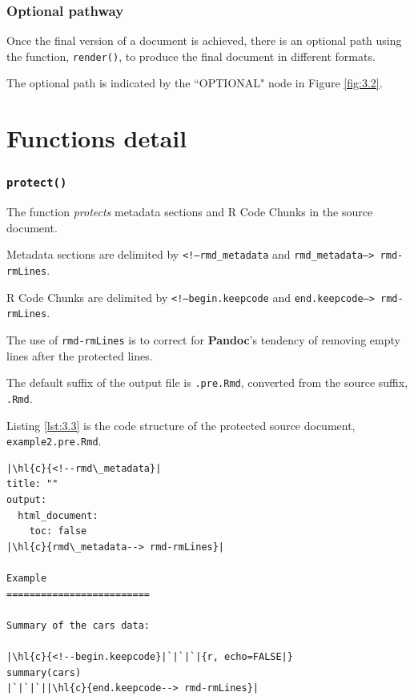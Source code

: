 \documentclass[a4paper, 12pt]{report}
\begin{document}
\subsubsection*{Optional pathway}
Once the final version of a document is achieved, there is an optional path using the function, \texttt{render()}, to produce the final document in different formats.

The optional path is indicated by the ``OPTIONAL" node in Figure \ref{fig:3.2}.



\newpage
\section{Functions detail}
\subsubsection*{\texttt{protect()}}
The function \emph{protects} metadata sections and R Code Chunks in the source document.

Metadata sections are delimited by \texttt{<!--rmd\_metadata} and \texttt{rmd\_metadata--> rmd-rmLines}.

R Code Chunks are delimited by \texttt{<!--begin.keepcode} and \texttt{end.keepcode--> rmd-rmLines}.

The use of \texttt{rmd-rmLines} is to correct for \textbf{Pandoc}'s tendency of removing empty lines after the protected lines.

The default suffix of the output file is \texttt{.pre.Rmd}, converted from the source suffix, \texttt{.Rmd}.

Listing \ref{lst:3.3} is the code structure of the protected source document, \texttt{example2.pre.Rmd}.
\begin{lstlisting}[caption={\texttt{example2.pre.Rmd}}, label={lst:3.3}, escapechar=\|]
|\hl{c}{<!--rmd\_metadata}|
title: ""
output:
  html_document:
    toc: false
|\hl{c}{rmd\_metadata--> rmd-rmLines}|

Example
=========================

Summary of the cars data:

|\hl{c}{<!--begin.keepcode}|`|`|`|{r, echo=FALSE|}
summary(cars)
|`|`|`||\hl{c}{end.keepcode--> rmd-rmLines}|
\end{lstlisting}
\end{document}
